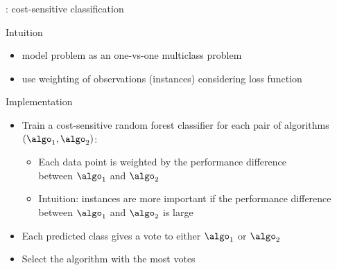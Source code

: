 \begin{frame}[c]{ : cost-sensitive classification}

\begin{block}{Intuition}
\begin{itemize}
  \item model problem as an one-vs-one multiclass problem
  \item use weighting of observations (instances) considering loss function
\end{itemize}
\end{block}

\pause
\begin{block}{Implementation}
\begin{itemize}
  \item Train a cost-sensitive random forest classifier for each pair of algorithms $(\algo_1, \algo_2)$:
  \begin{itemize}
  	\item Each data point is weighted by the performance difference\\ between $\algo_1$ and $\algo_2$
  	\item Intuition: instances are more important if the performance difference between $\algo_1$ and $\algo_2$ is large
  \end{itemize}
  \pause
  \item Each predicted class gives a vote to either $\algo_1$ or $\algo_2$
  \item Select the algorithm with the most votes
\end{itemize}
\end{block}

\end{frame}
